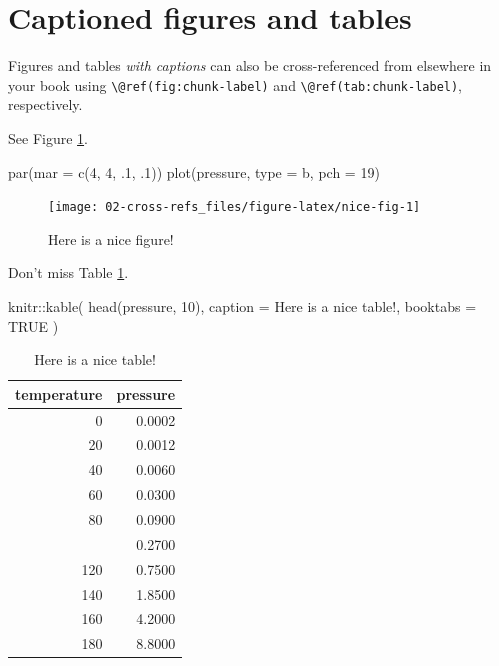 \documentclass[
]{book}
\newenvironment{Shaded}{\begin{snugshade}}{\end{snugshade}}
\newcommand{\AttributeTok}[1]{\textcolor[rgb]{0.77,0.63,0.00}{#1}}
\newcommand{\ConstantTok}[1]{\textcolor[rgb]{0.00,0.00,0.00}{#1}}
\newcommand{\DecValTok}[1]{\textcolor[rgb]{0.00,0.00,0.81}{#1}}
\newcommand{\FunctionTok}[1]{\textcolor[rgb]{0.00,0.00,0.00}{#1}}
\newcommand{\NormalTok}[1]{#1}
\newcommand{\SpecialCharTok}[1]{\textcolor[rgb]{0.00,0.00,0.00}{#1}}
\newcommand{\StringTok}[1]{\textcolor[rgb]{0.31,0.60,0.02}{#1}}
\theoremstyle{definition}
\theoremstyle{definition}
\theoremstyle{definition}
\theoremstyle{definition}
\theoremstyle{remark}
\begin{document}
\hypertarget{captioned-figures-and-tables}{%
\section{Captioned figures and tables}\label{captioned-figures-and-tables}}

Figures and tables \emph{with captions} can also be cross-referenced from elsewhere in your book using \texttt{\textbackslash{}@ref(fig:chunk-label)} and \texttt{\textbackslash{}@ref(tab:chunk-label)}, respectively.

See Figure \ref{fig:nice-fig}.

\begin{Shaded}
\begin{Highlighting}[]
\FunctionTok{par}\NormalTok{(}\AttributeTok{mar =} \FunctionTok{c}\NormalTok{(}\DecValTok{4}\NormalTok{, }\DecValTok{4}\NormalTok{, .}\DecValTok{1}\NormalTok{, .}\DecValTok{1}\NormalTok{))}
\FunctionTok{plot}\NormalTok{(pressure, }\AttributeTok{type =} \StringTok{\textquotesingle{}b\textquotesingle{}}\NormalTok{, }\AttributeTok{pch =} \DecValTok{19}\NormalTok{)}
\end{Highlighting}
\end{Shaded}

\begin{figure}

{\centering \texttt{[image: 02-cross-refs\_files/figure-latex/nice-fig-1]} 

}

\caption{Here is a nice figure!}\label{fig:nice-fig}
\end{figure}

Don't miss Table \ref{tab:nice-tab}.

\begin{Shaded}
\begin{Highlighting}[]
\NormalTok{knitr}\SpecialCharTok{::}\FunctionTok{kable}\NormalTok{(}
  \FunctionTok{head}\NormalTok{(pressure, }\DecValTok{10}\NormalTok{), }\AttributeTok{caption =} \StringTok{\textquotesingle{}Here is a nice table!\textquotesingle{}}\NormalTok{,}
  \AttributeTok{booktabs =} \ConstantTok{TRUE}
\NormalTok{)}
\end{Highlighting}
\end{Shaded}

\begin{table}

\caption{\label{tab:nice-tab}Here is a nice table!}
\centering
\begin{tabular}[t]{rr}
\toprule
temperature & pressure\\
\midrule
0 & 0.0002\\
20 & 0.0012\\
40 & 0.0060\\
60 & 0.0300\\
80 & 0.0900\\
\addlinespace
100 & 0.2700\\
120 & 0.7500\\
140 & 1.8500\\
160 & 4.2000\\
180 & 8.8000\\
\bottomrule
\end{tabular}
\end{table}
\end{document}
